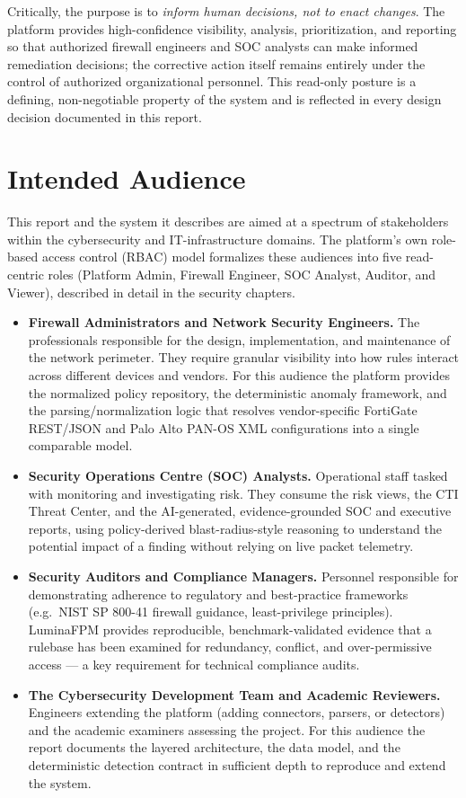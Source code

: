 \documentclass[12pt,a4paper]{report}
\renewcommand{\_}{\textunderscore\allowbreak}
\begin{document}
Critically, the purpose is to \emph{inform human decisions, not to enact changes}. The platform provides high-confidence visibility, analysis, prioritization, and reporting so that authorized firewall engineers and SOC analysts can make informed remediation decisions; the corrective action itself remains entirely under the control of authorized organizational personnel. This read-only posture is a defining, non-negotiable property of the system and is reflected in every design decision documented in this report.

\section{Intended Audience}
\label{sec:ch1-audience}

This report and the system it describes are aimed at a spectrum of stakeholders within the cybersecurity and IT-infrastructure domains. The platform's own role-based access control (RBAC) model formalizes these audiences into five read-centric roles (Platform Admin, Firewall Engineer, SOC Analyst, Auditor, and Viewer), described in detail in the security chapters.

\begin{itemize}[leftmargin=1.4em]
  \item \textbf{Firewall Administrators and Network Security Engineers.} The professionals responsible for the design, implementation, and maintenance of the network perimeter. They require granular visibility into how rules interact across different devices and vendors. For this audience the platform provides the normalized policy repository, the deterministic anomaly framework, and the parsing/normalization logic that resolves vendor-specific FortiGate REST/JSON and Palo Alto PAN-OS XML configurations into a single comparable model.
  \item \textbf{Security Operations Centre (SOC) Analysts.} Operational staff tasked with monitoring and investigating risk. They consume the risk views, the CTI Threat Center, and the AI-generated, evidence-grounded SOC and executive reports, using policy-derived blast-radius-style reasoning to understand the potential impact of a finding without relying on live packet telemetry.
  \item \textbf{Security Auditors and Compliance Managers.} Personnel responsible for demonstrating adherence to regulatory and best-practice frameworks (e.g.\ NIST SP 800-41 firewall guidance, least-privilege principles). LuminaFPM provides reproducible, benchmark-validated evidence that a rulebase has been examined for redundancy, conflict, and over-permissive access --- a key requirement for technical compliance audits.
  \item \textbf{The Cybersecurity Development Team and Academic Reviewers.} Engineers extending the platform (adding connectors, parsers, or detectors) and the academic examiners assessing the project. For this audience the report documents the layered architecture, the data model, and the deterministic detection contract in sufficient depth to reproduce and extend the system.
\end{itemize}
\end{document}

